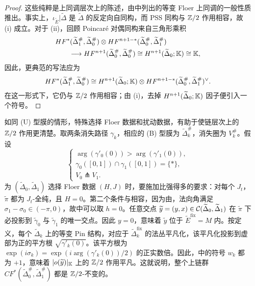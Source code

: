\begin{proof}
这些纯粹是上同调层次上的陈述，由中列出的等变 Floer 上同调的一般性质推出。事实上，$\iota_{\widetilde E}|\widetilde\Delta$ 是 $\widetilde\Delta$ 的反定向自同构，而 PSS 同构与 $\mathbb Z/2$ 作用相容，故 (i) 成立。对于 (ii)，回顾 Poincaré 对偶同构来自三角形乘积
\[
\begin{aligned}
&HF^*(\widetilde\Delta_1^\#,\widetilde\Delta_0^\#)\otimes HF^{n+1-*}(\widetilde\Delta_0^\#,\widetilde\Delta_1^\#)\\
&\qquad\longrightarrow HF^{n+1}(\widetilde\Delta_0^\#,\widetilde\Delta_0^\#)\cong H^{n+1}(\widetilde\Delta_0;\mathbb K)\cong\mathbb K,
\end{aligned}
\]
因此，更典范的写法应为
\[
HF^*(\widetilde\Delta_1^\#,\widetilde\Delta_0^\#)\cong H^{n+1}(\widetilde\Delta_0;\mathbb K)\otimes HF^{n+1-*}(\widetilde\Delta_0^\#,\widetilde\Delta_1^\#)^\vee.
\]
在这一形式下，它仍与 $\mathbb Z/2$ 作用相容；由 (i)，去掉 $H^{n+1}(\widetilde\Delta_0;\mathbb K)$ 因子便引入一个符号。
\end{proof}

如同 (U) 型膜的情形，特殊选择 Floer 数据和扰动数据，有助于使链层次上的 $\mathbb Z/2$ 作用更清楚。取两条消失路径 $\gamma_k$，相应的 (B) 型膜为 $\widetilde\Delta_k^\#$，消失圈为 $V_k^\#$。假设
\begin{equation}\label{eq:18.22}
\begin{cases}
\arg(\gamma'_0(0))>\arg(\gamma'_1(0)),\\
\gamma_0([0,1])\cap\gamma_1([0,1])=\{*\},\\
V_0\pitchfork V_1.
\end{cases}
\end{equation}
为 $(\widetilde\Delta_0,\widetilde\Delta_1)$ 选择 Floer 数据 $(H,J)$ 时，要施加比强得多的要求：对每个 $J_t$，$\widetilde\pi$ 都为 $J_t$-全纯，且 $H=0$。第二个条件与相容，因为由，法向角满足 $\sigma_1-\sigma_0\in(-\pi,0)$，故中可以取 $h=0$。任意交点 $\widetilde y=(y,x)\in\mathcal C(\widetilde\Delta_0,\widetilde\Delta_1)$ 在 $\widetilde\pi$ 下必投影到 $\widetilde\gamma_0$ 与 $\widetilde\gamma_1$ 的唯一交点。因此 $y=0$，意味着 $\widetilde y$ 位于 $\widetilde E^{\mathrm{fix}}=M$ 内。按定义，每个 $\widetilde\Delta_k$ 上的等变 Pin 结构，对应于 $\widetilde\Delta_k^{\mathrm{fix}}$ 的法丛平凡化，该平凡化投影到虚部为正的平方根 $\sqrt{\gamma'_k(0)}$。该平方根为 $\exp(i\sigma_k)=\exp(i\arg(\gamma'_k(0))/2)$ 的正实数倍。因此，中的符号 $w_k$ 都为 $+1$，意味着 $|o(\widetilde y)|_{\mathbb K}$ 上的 $\mathbb Z/2$ 作用平凡。这就说明，整个上链群 $CF^*(\widetilde\Delta_0^\#,\widetilde\Delta_1^\#)$ 都是 $\mathbb Z/2$-不变的。

